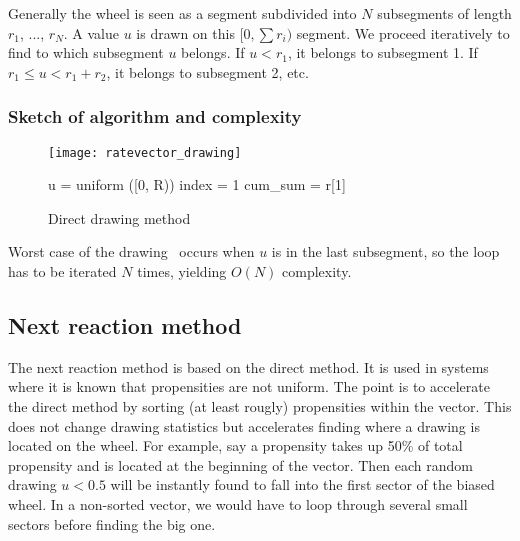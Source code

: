 Generally the wheel is seen as a segment subdivided into $N$ subsegments of length $r_1$, ..., $r_N$. A value $u$ is drawn on this $[0, \sum r_i)$ segment. We proceed iteratively to find to which subsegment $u$ belongs. If $u < r_1$, it belongs to subsegment 1. If $r_1 \leq u < r_1+r_2$, it belongs to subsegment 2, etc.

\subsubsection {Sketch of algorithm and complexity} 

\begin{figure}[!h]
  \begin{minipage}{0.5\textwidth}
    \texttt{[image: ratevector\_drawing]}
  \end{minipage}
  \begin{minipage}{0.5\textwidth}
    \begin{algorithm}[H]
      u = uniform ([0, R))\;
        index = 1\;
        cum\_sum = r[1]\;
    \end{algorithm}
  \end{minipage}
  \caption{Direct drawing method}
  \label{fig:direct_search}
\end {figure}

Worst case of the drawing~ occurs when $u$ is in the last subsegment, so the loop has to be iterated $N$ times, yielding $O(N)$ complexity.

\subsection {Next reaction method}

The next reaction method is based on the direct method. It is used in systems where it is known that propensities are not uniform. The point is to accelerate the direct method by sorting (at least rougly) propensities within the vector. This does not change drawing statistics but accelerates finding where a drawing is located on the wheel. For example, say a propensity takes up 50\% of total propensity and is located at the beginning of the vector. Then each random drawing $u < 0.5$ will be instantly found to fall into the first sector of the biased wheel. In a non-sorted vector, we would have to loop through several small sectors before finding the big one.

